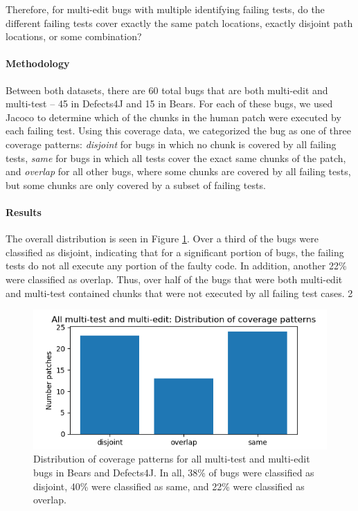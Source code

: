 Therefore, for multi-edit bugs with multiple identifying failing tests, do the 
different failing tests cover exactly the same patch locations, exactly 
disjoint path locations, or some combination?



\paragraph{Methodology}

Between both datasets, there are 60 total bugs that are both multi-edit and 
multi-test -- 45 in Defects4J and 15 in Bears. For each of these bugs, we used 
Jacoco to determine which of the chunks in the human patch were executed by each failing test. Using 
this coverage data, we categorized the bug as one of 
three coverage patterns: \textit{disjoint} for bugs in which no chunk is covered by all failing tests, 
\textit{same} for bugs in which all 
tests cover the exact same chunks of the patch, and \textit{overlap} for all 
other bugs, where some chunks are covered by all failing tests, but some chunks are only covered by a 
subset of failing tests.

\paragraph{Results}
The overall distribution is seen in Figure \ref{fig:coverage-all}. Over a third 
of the bugs were classified as disjoint, indicating that for a significant 
portion of bugs, the failing tests do not all execute any portion of the faulty 
code. In addition, another 22\% were classified as overlap. Thus, over half of 
the bugs that were both multi-edit and multi-test contained chunks that were 
not executed by all failing test cases.
2

\begin{figure}
	\includegraphics[width=\linewidth]{img/coverage-all.png}
	\caption{Distribution of coverage patterns for all multi-test and 
	multi-edit bugs in Bears and Defects4J. In all, 38\% of bugs were classified as disjoint, 40\% were 
	classified as same, and 22\% were classified as overlap.}
	\label{fig:coverage-all}
\end{figure}

